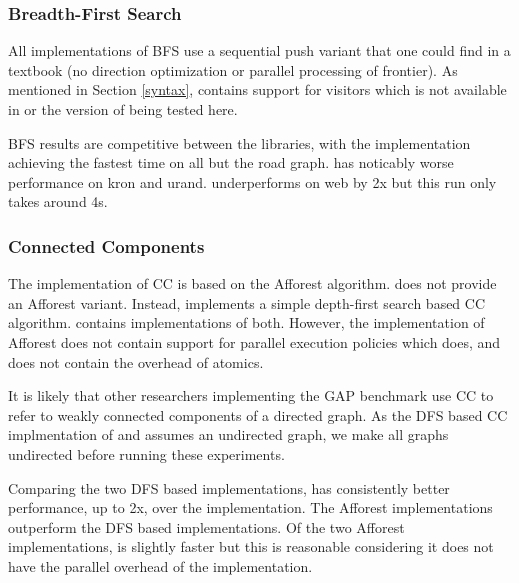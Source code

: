 \subsubsection{Breadth-First Search}
All implementations of BFS use a sequential push variant that one could find in a textbook
(no direction optimization or parallel processing of frontier).
As mentioned in Section \ref{syntax}, \bgl contains support for visitors which is not available
in \nwgraph or the version of \stdgraph being tested here.



BFS results are competitive between the libraries, with the \stdgraph implementation achieving the fastest time on all but the road graph.
\nwgraph has noticably worse performance on kron and urand.
\bgl underperforms on web by 2x but this run only takes around 4s.

\subsubsection{Connected Components}
The \nwgraph implementation of CC is based on the Afforest \cite{sutton2018optimizing} algorithm.
\bgl does not provide an Afforest variant.
Instead, \bgl implements a simple depth-first search based CC algorithm.
\stdgraph contains implementations of both.
However, the \stdgraph implementation of Afforest does not contain support for parallel execution
policies which \nwgraph does, and does not contain the overhead of atomics.

It is likely that other researchers implementing the GAP benchmark use CC to refer
to weakly connected components of a directed graph.
As the DFS based CC implmentation of \bgl and \stdgraph assumes an undirected graph,
we make all graphs undirected before running these experiments.

Comparing the two DFS based implementations, \stdgraph has consistently better performance, up to 2x, over the \bgl implementation.
The Afforest implementations outperform the DFS based implementations.
Of the two Afforest implementations, \stdgraph is slightly faster but this is reasonable considering
it does not have the parallel overhead of the \nwgraph implementation.

